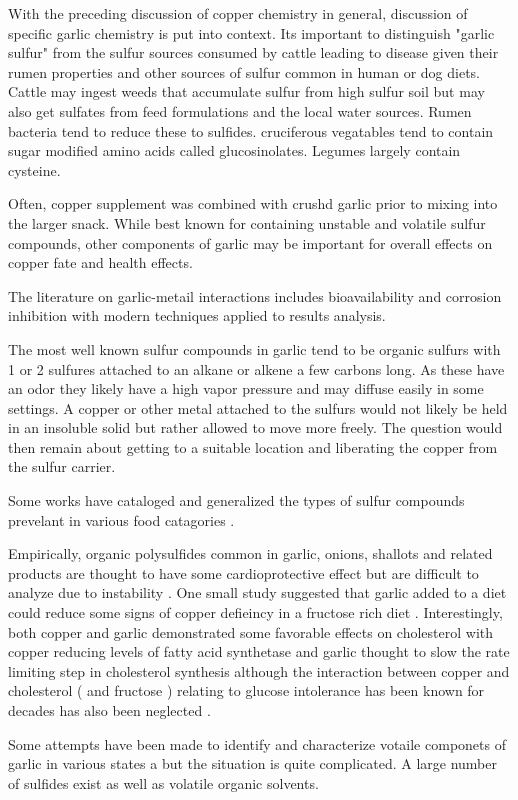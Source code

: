 
With the preceding discussion of copper chemistry in general,
discussion of specific garlic chemistry is put into context.
Its important to distinguish "garlic sulfur" from the
sulfur sources consumed by cattle leading to disease
given their rumen properties and other sources of sulfur
common in human or dog diets. Cattle may ingest weeds that
accumulate sulfur from high sulfur soil but may also get
sulfates from feed formulations and the local water
sources. Rumen bacteria tend to reduce these to sulfides.
cruciferous vegatables tend to contain sugar modified amino acids
called glucosinolates. Legumes largely contain cysteine.
 



Often, copper supplement was combined with crushd garlic
prior to mixing into the larger snack. While best known
for containing unstable and volatile sulfur compounds,
other components of garlic may be important for overall
effects on copper fate and health effects.

The literature on garlic-metail interactions includes
bioavailability and corrosion inhibition with modern
techniques applied to results analysis. 


The most well known sulfur compounds in garlic tend to 
be organic sulfurs with 1 or 2 sulfures attached to an
alkane or alkene a few carbons long. As these have
an odor they likely have a high vapor pressure and
may diffuse easily in some settings. A copper or
other metal attached to the sulfurs would not likely
be held in an insoluble solid but rather allowed
to move more freely. The question would then remain
about getting to a suitable location and liberating
the copper from the sulfur carrier. 




Some works have cataloged and generalized the types
of sulfur compounds prevelant in various food catagories 
\cite{PMC10130226}.

Empirically, organic polysulfides common in garlic,
onions, shallots and related products are thought to have some
cardioprotective effect but are difficult to analyze due
to instability  \cite{PMC4428374}.
One small study suggested that garlic added to a diet could
reduce some signs of copper defieincy in a fructose rich
diet \cite{Fields_Lewis_Lure_Garlic_extract_ameliorates_1992}.
Interestingly, both copper and garlic demonstrated some favorable
effects on cholesterol with copper reducing levels of fatty acid
synthetase and garlic thought to slow the rate limiting step in cholesterol 
synthesis \cite{Konjufca_Pesti_Bakalli_Modulation_cholesterol_levels_1997}
although the interaction between copper and cholesterol ( and fructose )
relating to glucose intolerance has been known for decades
has also been  neglected
\cite{Klevay_Metabolic_interactions_among_dietary_2010}.






Some attempts have been made to identify and characterize
votaile componets of garlic in various states 
\cite{Abe_Hori_Myoda_Volatile_compounds_fresh_2019}
a but the situation is quite complicated. A large number of
sulfides exist as well as volatile organic solvents. 
